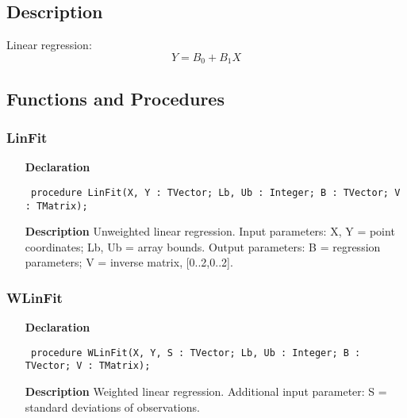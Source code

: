 \documentclass[12pt,a4paper,oneside]{report}
\newcommand{\declarationitem}[1]{\textbf{#1}}
\newcommand{\descriptiontitle}[1]{\textbf{#1}}
\newcommand{\code}[1]{\texttt{#1}}
\begin{document}
\subsection{Description}
Linear regression:
$$Y = B_0 + B_1X$$ 
\subsection{Functions and Procedures}
\subsubsection{LinFit}
\label{ulinfit-LinFit}
\begin{itemize}\item[\declarationitem{Declaration}\hfill]
	\begin{flushleft}
		\code{
			procedure LinFit(X, Y : TVector; Lb, Ub : Integer; B : TVector; V : TMatrix);}
		
	\end{flushleft}
	
	\par
	\item[\descriptiontitle{Description}]
	Unweighted linear regression. Input parameters: X, Y = point coordinates; Lb, Ub = array bounds. Output parameters: B = regression parameters; V = inverse matrix, [0..2,0..2].
	
\end{itemize}
\subsubsection{WLinFit}
\label{ulinfit-WLinFit}
\begin{itemize}\item[\declarationitem{Declaration}\hfill]
	\begin{flushleft}
		\code{
			procedure WLinFit(X, Y, S : TVector; Lb, Ub : Integer; B : TVector; V : TMatrix);}
		
	\end{flushleft}
	
	\par
	\item[\descriptiontitle{Description}]
	Weighted linear regression. Additional input parameter: S = standard deviations of observations.
	
\end{itemize}
\end{document}
